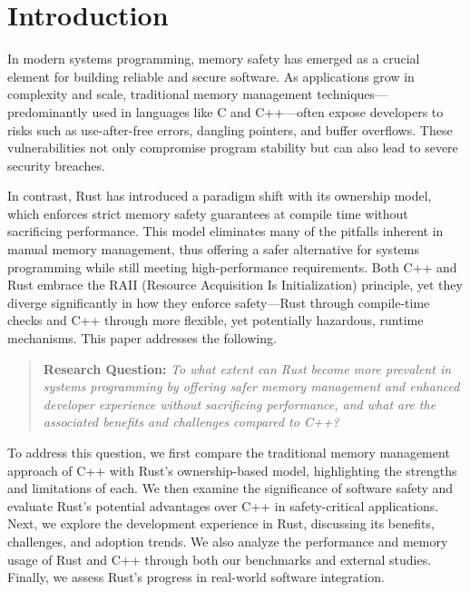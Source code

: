 \chapter{Introduction}
\label{ch:introduction}

In modern systems programming, memory safety has emerged as a crucial element for building reliable and secure software. As applications grow in complexity and scale, traditional memory management techniques—predominantly used in languages like C and C++—often expose developers to risks such as use-after-free errors, dangling pointers, and buffer overflows. These vulnerabilities not only compromise program stability but can also lead to severe security breaches.

In contrast, Rust has introduced a paradigm shift with its ownership model, which enforces strict memory safety guarantees at compile time without sacrificing performance. This model eliminates many of the pitfalls inherent in manual memory management, thus offering a safer alternative for systems programming while still meeting high-performance requirements. Both C++ and Rust embrace the RAII (Resource Acquisition Is Initialization) principle, yet they diverge significantly in how they enforce safety—Rust through compile-time checks and C++ through more flexible, yet potentially hazardous, runtime mechanisms. This paper addresses the following.

\begin{quote}
    \textbf{Research Question: }
    \textit{To what extent can Rust become more prevalent in systems programming by offering safer memory management and enhanced developer experience without sacrificing performance, and what are the associated benefits and challenges compared to C++?}
\end{quote}

To address this question, we first compare the traditional memory management approach of C++ with Rust’s ownership-based model, highlighting the strengths and limitations of each. We then examine the significance of software safety and evaluate Rust’s potential advantages over C++ in safety-critical applications. Next, we explore the development experience in Rust, discussing its benefits, challenges, and adoption trends. We also analyze the performance and memory usage of Rust and C++ through both our benchmarks and external studies. Finally, we assess Rust’s progress in real-world software integration.

